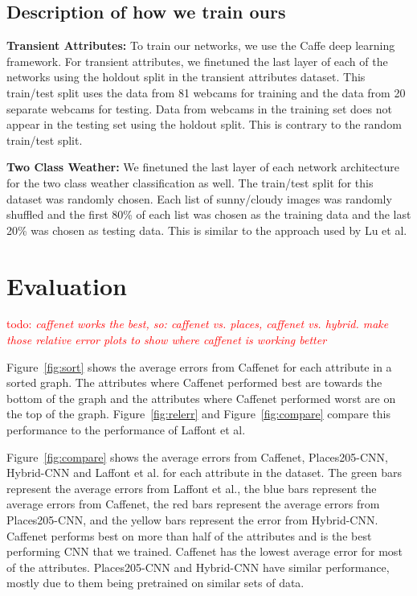 \documentclass{article}
\newcommand{\todo}[1]{\textcolor{red}{todo: {\em #1}}}
\newcommand{\figref}[1]{Figure~\ref{fig:#1}}
\begin{document}
\subsection{Description of how we train ours}
\indent

\textbf{Transient Attributes:} To train our networks, we use the Caffe\cite{caffe14} 
deep learning framework. For transient attributes, we finetuned the last layer of each
of the networks using the holdout split in the transient attributes dataset.  This 
train/test split uses the data from 81 webcams for training and the data from 20 separate 
webcams for testing.  Data from webcams in the training set does not
appear in the testing set using the holdout split.  This is contrary to 
the random train/test split.  

\textbf{Two Class Weather:} We finetuned the last layer of each network architecture
for the two class weather classification as well.  The train/test split for this dataset
was randomly chosen.  Each list of sunny/cloudy images was randomly shuffled and the 
first 80\% of each list was chosen as the training data and the last 20\% was chosen
as testing data.  This is similar to the approach used by Lu\cite{lutwoclass} et al.




\section{Evaluation}

\todo{caffenet works the best, so: caffenet vs. places, caffenet vs. hybrid.
			make those relative error plots to show where caffenet is working better}

\figref{sort} shows the average errors from Caffenet for each attribute
in a sorted graph.  The attributes where Caffenet performed best are towards
the bottom of the graph and the attributes where Caffenet performed
worst are on the top of the graph. \figref{relerr} and \figref{compare} 
compare this performance to the performance of Laffont et al.

\figref{compare} shows the average errors from Caffenet, Places205-CNN, Hybrid-CNN
and Laffont et al. for each attribute in the dataset.  The green bars represent the 
average errors from Laffont et al., the blue bars represent the average errors from 
Caffenet, the red bars represent the average errors from Places205-CNN, and the 
yellow bars represent the error from Hybrid-CNN. Caffenet performs best on more than
half of the attributes and is the best performing CNN that we trained.  Caffenet has 
the lowest average error for most of the attributes.  Places205-CNN and Hybrid-CNN 
have similar performance, mostly due to them being pretrained on similar sets of 
data.
\end{document}
